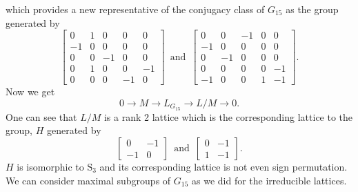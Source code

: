 \documentclass{article}
\theoremstyle{plain}
\theoremstyle{definition}
\newcommand{\Z}{\ensuremath{\mathbb{Z}}}
\newcommand{\tand}{\ensuremath{\,\,\, \text{and} \,\,\,}}
\begin{document}
which provides a new representative of the conjugacy class of $G_{15}$ as the group generated by  
$$
 \left[ \begin {array}{ccc|cc} 0&1&0&0&0\\-1&0&0&0&0
\\0&0&-1&0&0\\ \hline 0&1&0&0&-1
\\0&0&0&-1&0\end {array} \right] 
\tand
 \left[ \begin {array}{ccc|cc} 0&0&-1&0&0\\-1&0&0&0&0
\\0&-1&0&0&0\\ \hline 0&0&0&0&-1
\\-1&0&0&1&-1\end {array} \right].
$$
Now we get 
$$0 \longrightarrow M \longrightarrow L_{G_{15}}\longrightarrow L/M \longrightarrow 0.$$
One can see that $L/M$ is  a rank 2 lattice which is the corresponding lattice to the group, $H$ generated by 
$$
\begin{bmatrix}
0&-1\\
-1&0
\end{bmatrix}
\tand 
\begin{bmatrix}
0&-1\\
1 & -1
\end{bmatrix}.
$$ 
$H$ is isomorphic to $\mathrm{S}_3$ and its corresponding lattice is not even sign permutation. We can consider maximal subgroups of $G_{15}$ as we did for the irreducible lattices.
%
\end{document}
